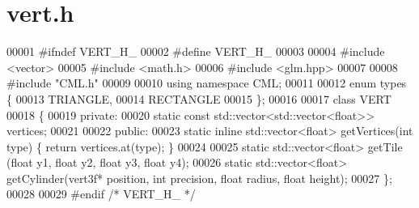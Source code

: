 \section{vert.\+h}
\label{vert_8h_source}

\begin{DoxyCode}
00001 \textcolor{preprocessor}{#ifndef VERT\_H\_}
00002 \textcolor{preprocessor}{#define VERT\_H\_}
00003 
00004 \textcolor{preprocessor}{#include <vector>}
00005 \textcolor{preprocessor}{#include <math.h>}
00006 \textcolor{preprocessor}{#include <glm.hpp>}
00007 
00008 \textcolor{preprocessor}{#include "CML.h"}
00009 
00010 \textcolor{keyword}{using namespace }CML;
00011 
00012 \textcolor{keyword}{enum} types \{
00013     TRIANGLE,
00014     RECTANGLE
00015 \};
00016 
00017 \textcolor{keyword}{class }VERT
00018 \{
00019 \textcolor{keyword}{private}:
00020     \textcolor{keyword}{static} \textcolor{keyword}{const} std::vector<std::vector<float>> vertices;
00021 
00022 \textcolor{keyword}{public}:
00023     \textcolor{keyword}{static} \textcolor{keyword}{inline} std::vector<float> getVertices(\textcolor{keywordtype}{int} type) \{ \textcolor{keywordflow}{return} vertices.at(type); \}
00024 
00025     \textcolor{keyword}{static} std::vector<float> getTile    (\textcolor{keywordtype}{float} y1, \textcolor{keywordtype}{float} y2, \textcolor{keywordtype}{float} y3, \textcolor{keywordtype}{float} y4);
00026     \textcolor{keyword}{static} std::vector<float> getCylinder(vert3f* position, \textcolor{keywordtype}{int} precision, \textcolor{keywordtype}{float} radius, \textcolor{keywordtype}{float} height);
00027 \};
00028 
00029 \textcolor{preprocessor}{#endif }\textcolor{comment}{/* VERT\_H\_ */}\textcolor{preprocessor}{}
\end{DoxyCode}
